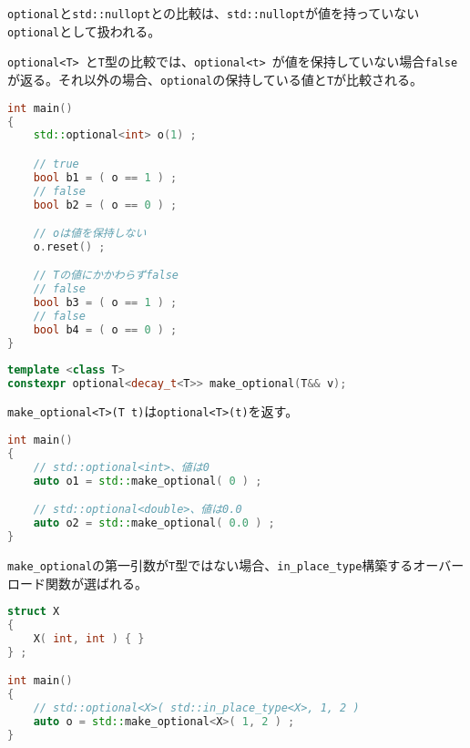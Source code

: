 \lstinline!optional!と\lstinline!std::nullopt!との比較は、\lstinline!std::nullopt!が値を持っていない\lstinline!optional!として扱われる。

%

\lstinline!optional<T>!~と\lstinline!T!型の比較では、\lstinline!optional<t>!~が値を保持していない場合\lstinline!false!が返る。それ以外の場合、\lstinline!optional!の保持している値と\lstinline!T!が比較される。

\begin{lstlisting}[language=C++]
int main()
{
    std::optional<int> o(1) ;

    // true
    bool b1 = ( o == 1 ) ;
    // false
    bool b2 = ( o == 0 ) ;

    // oは値を保持しない
    o.reset() ;

    // Tの値にかかわらずfalse
    // false
    bool b3 = ( o == 1 ) ;
    // false
    bool b4 = ( o == 0 ) ;
}
\end{lstlisting}

%

\bgroup
\begin{lstlisting}[language=C++]
template <class T>
constexpr optional<decay_t<T>> make_optional(T&& v);
\end{lstlisting}
\egroup

\lstinline!make_optional<T>(T t)!は\lstinline!optional<T>(t)!を返す。

\begin{lstlisting}[language=C++]
int main()
{
    // std::optional<int>、値は0
    auto o1 = std::make_optional( 0 ) ;

    // std::optional<double>、値は0.0
    auto o2 = std::make_optional( 0.0 ) ;
}
\end{lstlisting}

%

\lstinline!make_optional!の第一引数が\lstinline!T!型ではない場合、\lstinline!in_place_type!構築するオーバーロード関数が選ばれる。

\begin{lstlisting}[language=C++]
struct X
{
    X( int, int ) { }
} ;

int main()
{
    // std::optional<X>( std::in_place_type<X>, 1, 2 )
    auto o = std::make_optional<X>( 1, 2 ) ;
}
\end{lstlisting}

